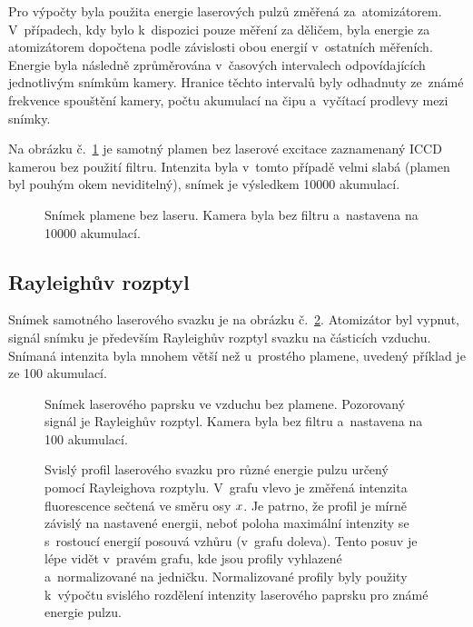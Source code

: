 Pro výpočty byla použita energie laserových pulzů změřená za~atomizátorem.
V~případech, kdy bylo k~dispozici pouze měření za děličem,
byla energie za atomizátorem dopočtena podle závislosti obou energií
v~ostatních měřeních.
Energie byla následně zprůměrována v~časových intervalech odpovídajících
jednotlivým snímkům kamery.
Hranice těchto intervalů byly odhadnuty ze~známé frekvence spouštění
kamery, počtu akumulací na čipu a~vyčítací prodlevy mezi sním\-ky.

Na obrázku č.~\ref{fig:lif-flame} je samotný plamen bez laserové excitace
zaznamenaný ICCD kamerou bez použití filtru.
Intenzita byla v~tomto případě velmi slabá
(plamen byl pouhým okem neviditelný),
snímek je výsledkem \num{10000} akumulací.

\begin{figure}[p]
	\centering
	
	\caption{Snímek plamene bez laseru.
		Kamera byla bez filtru a~nastavena na \num{10000} akumulací.}
	\label{fig:lif-flame}
\end{figure}

\subsection{Rayleighův rozptyl}
\label{sec:lif-rayleigh}

Snímek samotného laserového svazku je na obrázku č.~\ref{fig:lif-beam}.
Atomizátor byl vypnut, signál snímku je především Rayleighův rozptyl
svazku na částicích vzduchu.
Snímaná intenzita byla mnohem větší než u~prostého plamene,
uvedený příklad je ze \num{100} akumulací.

\begin{figure}[p]
	\centering
	
	\caption{Snímek laserového paprsku ve vzduchu bez plamene.
		Pozorovaný signál je Rayleighův rozptyl.
		Kamera byla bez filtru a~nastavena na \num{100} akumulací.}
	\label{fig:lif-beam}
\end{figure}

\begin{figure}
	\centering
	\hfill
	
	\caption{Svislý profil laserového svazku pro různé energie pulzu
		určený pomocí Rayleighova rozptylu.
		V~grafu vlevo je změřená intenzita fluorescence sečtená
		ve směru osy $x$.
		Je patrno, že profil je mírně závislý na nastavené energii,
		neboť poloha maximální intenzity se s~rostoucí energií posouvá
		vzhůru (v~grafu doleva).
		Tento posuv je lépe vidět v~pravém grafu, kde jsou profily
		vyhlazené a~normalizované na jedničku.
		Normalizované profily byly použity k~výpočtu svislého
		rozdělení intenzity laserového paprsku pro známé energie pulzu.}
	\label{fig:lif-rayleigh-profile}
\end{figure}

